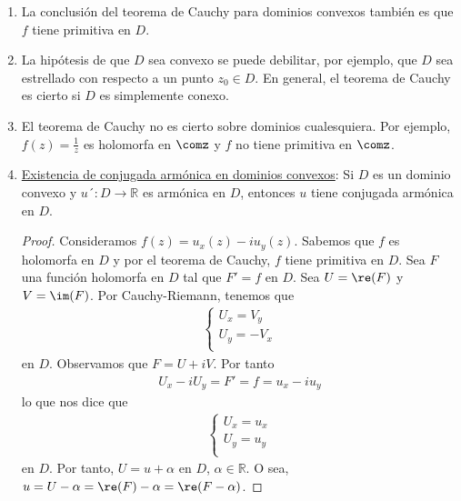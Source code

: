 \begin{obs}
\begin{enumerate}
    \item La conclusión del teorema de Cauchy para dominios convexos también es que $f$ tiene primitiva en $D$.
    \item La hipótesis de que $D$ sea convexo se puede debilitar, por ejemplo, que $D$ sea estrellado con respecto a un punto $z_0 \in D$. En general, el teorema de Cauchy es cierto si $D$ es simplemente conexo.
    \item El teorema de Cauchy no es cierto sobre dominios cualesquiera. Por ejemplo, $f(z) = \frac{1}{z}$ es holomorfa en $\comz$ y $f$ no tiene primitiva en $\comz$.
    \item \underline{Existencia de conjugada armónica en dominios convexos}: Si $D$ es un dominio convexo y $u´: D \longrightarrow \mathbb{R}$ es armónica en $D$, entonces $u$ tiene conjugada armónica en $D$.
    \begin{proof}
    Consideramos $f(z) = u_x(z) - iu_y(z)$. Sabemos que $f$ es holomorfa en $D$ y por el teorema de Cauchy, $f$ tiene primitiva en $D$. Sea $F$ una función holomorfa en $D$ tal que $F' = f$ en $D$. Sea $U = \re(F)$ y $V = \im(F)$. Por Cauchy-Riemann, tenemos que
    \begin{align*}
        \left\{ \begin{array}{lcc}
            U_x = V_y \\
            U_y = -V_x\\
             \end{array}
        \right.
    \end{align*}
    en $D$. Observamos que $F = U + iV$. Por tanto
    \begin{align*}
        U_x - iU_y = F' = f = u_x - iu_y
    \end{align*}
    lo que nos dice que
    \begin{align*}
        \left\{ \begin{array}{lcc}
            U_x = u_x \\
            U_y = u_y\\
             \end{array}
        \right.
    \end{align*}
    en $D$. Por tanto, $U = u + \alpha$ en $D$, $\alpha \in \mathbb{R}$. O sea, $u = U - \alpha = \re(F) - \alpha = \re(F - \alpha)$.
    \end{proof}
\end{enumerate}
\end{obs}

